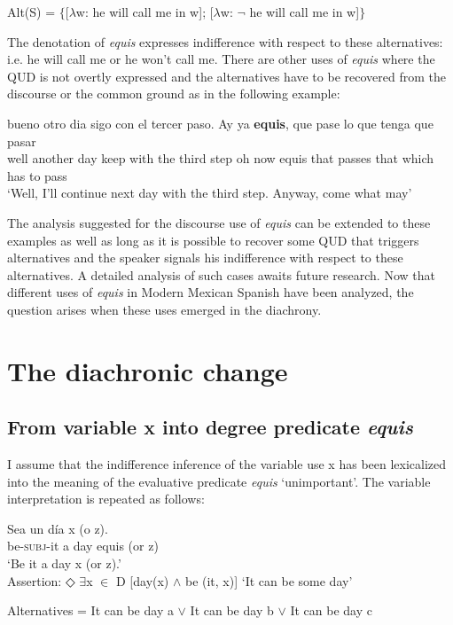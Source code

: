 \documentclass[output=paper]{langsci/langscibook}
\begin{document}
\ea\label{ex:kellert:56} Alt(S) = $\lbrace${[}$\lambda$w: he will call me in w{]}; {[}$\lambda$w: $¬$ he will call me in w{]}$\rbrace$
\z

The denotation of \textit{equis} expresses indifference with respect to these alternatives: i.e. he will call me or he won’t call me. There are other uses of \textit{equis} where the QUD is not overtly expressed and the alternatives have to be recovered from the discourse or the common ground as in the following example:

\ea\label{ex:kellert:57}
\gll bueno otro dia sigo con el tercer paso. Ay ya \textbf{equis}, que pase lo que tenga que pasar\\
well another day keep with the third step oh now equis that passes that which has to pass\\
\glt ‘Well, I’ll continue next day with the third step. Anyway, come what may’
\z

The analysis suggested for the discourse use of \textit{equis} can be extended to these examples as well as long as it is possible to recover some QUD that triggers alternatives and the speaker signals his indifference with respect to these alternatives. A detailed analysis of such cases awaits future research.
Now that different uses of \textit{equis} in Modern Mexican Spanish have been analyzed, the question arises when these uses emerged in the diachrony.

\section{The diachronic change}\label{sec:kellert:4}

\subsection{From variable x into degree predicate \textit{equis}}\label{sec:kellert:4.1}
I assume that the indifference inference of the variable use x has been lexicalized into the meaning of the evaluative predicate \textit{equis} ‘unimportant’.  The variable interpretation is repeated as follows:

\ea\label{ex:kellert:58}
\gll Sea un día x (o z).\\
 be-\textsc{subj}-it a day equis (or z)\\
\glt ‘Be it a day x (or z).’\\
Assertion: ◇ $\exists$x $\in$ D {[}day(x) $\wedge$ be (it, x){]} ‘It can be some day’\par
Alternatives = It can be day a $\vee$ It can be day b $\vee$ It can be day c
\z
\end{document}

